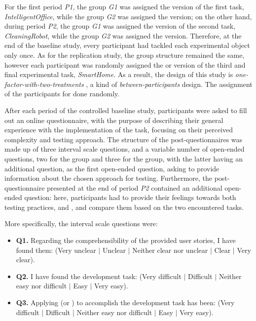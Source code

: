 For the first period \textit{P1}, the group \textit{G1} was assigned the \tdd version of the first task, \textit{IntelligentOffice}, while the group \textit{G2} was assigned the \notdd version; on the other hand, during period \textit{P2}, the group \textit{G1} was assigned the \notdd version of the second task, \textit{CleaningRobot}, while the group \textit{G2} was assigned the \tdd version.
Therefore, at the end of the baseline study, every participant had tackled each experimental object only once.
As for the replication study, the group structure remained the same, however each participant was randomly assigned the \tdd or \notdd version of the third and final experimental task, \textit{SmartHome}. As a result, the design of this study is \textit{one-factor-with-two-treatments} \cite{DBLP:books/sp/WohlinRHOR00}, a kind of \textit{between-participants} design. The assignment of the participants for done randomly.

After each period of the controlled baseline study, participants were asked to fill out an online questionnaire, with the purpose of describing their general experience with the implementation of the task, focusing on their perceived complexity and testing approach. 
The structure of the post-questionnaires was made up of three interval scale questions, and a variable number of open-ended questions, two for the \tdd group and three for the \notdd group, with the latter having an additional question, as the first open-ended question, asking to provide information about the chosen approach for testing. Furthermore, the post-questionnaire presented at the end of period \textit{P2} contained an additional open-ended question: here, participants had to provide their feelings towards both testing practices, \tdd and \notdd, and compare them based on the two encountered tasks. 

\noindent More specifically, the interval scale questions were:
\begin{itemize}
    \item \textbf{Q1.} Regarding the comprehensibility of the provided user stories, I have found them: (Very unclear $|$ Unclear $|$ Neither clear nor unclear $|$ Clear $|$ Very clear).
    \item \textbf{Q2.} I have found the development task: (Very difficult $|$ Difficult $|$ Neither easy nor difficult $|$ Easy $|$ Very easy).
    \item \textbf{Q3.} Applying (\ie \tdd or \notdd) to accomplish the development task has been: (Very difficult $|$ Difficult $|$ Neither easy nor difficult $|$ Easy $|$ Very easy).
\end{itemize}

